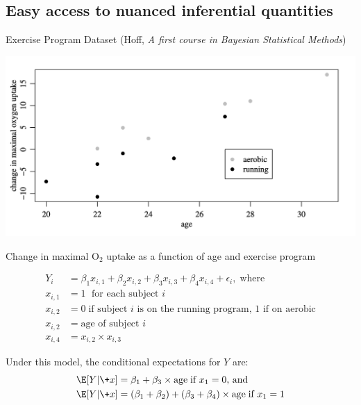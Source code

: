 \documentclass[10pt]{beamer}
\begin{document}
\subsection{Easy access to nuanced inferential quantities}

\begin{frame}{Exercise Program Dataset \hfill \tiny (Hoff, \textit{A first course in Bayesian Statistical Methods}) }
	
\begin{center}
\includegraphics[width=.5\textwidth]{images/hoff_exercise_program_data}

\scriptsize Change in maximal $\text{O}_2$ uptake as a function of age and exercise program
\end{center}

{\normalsize {}}
\scriptsize 
\begin{align*}
Y_i &= \beta_1 x_{i,1} + \beta_2 x_{i,2} + \beta_3 x_{i,3} + \beta_4 x_{i,4} + \epsilon_i, \; \text{where} \\
x_{i,1} &=1 \; \text{ for each subject $i$} \\
x_{i,2} &=0 \; \text{if subject $i$ is on the running program, 1 if on aerobic} \\
x_{i,2} &= \text{age of subject $i$} \\
x_{i,4} &= x_{i,2} \times x_{i,3}
\end{align*}

Under this model, the conditional expectations for $Y$ are:
\begin{align*}
\E[Y|\+x] &= \beta_1 + \beta_3 \times \text{age} \; \text{if $x_1 =0$, and} \\
\E[Y|\+x] &= (\beta_1 + \beta_2) + (\beta_3 + \beta_4) \times \text{age} \; \text{if $x_1 =1$} 
\end{align*}
\end{frame}
\end{document}
